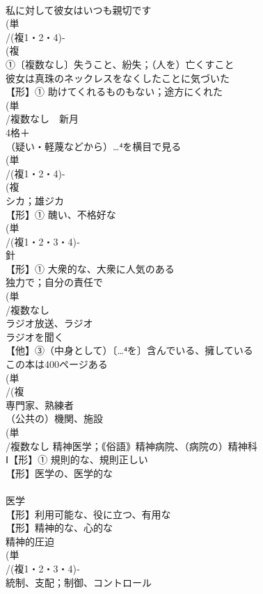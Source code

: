 \documentclass[8pt]{extreport}
\begin{document}
\begin{CJK}{UTF8}{min}
\\	私に対して彼女はいつも親切です
\\	(単
\\	/(複1・2・4)-
\\	(複
\\	①〔複数なし〕失うこと、紛失；（人を）亡くすこと 
\\	彼女は真珠のネックレスをなくしたことに気づいた
\\	【形】① 助けてくれるものもない；途方にくれた 
\\	(単
\\	/複数なし　新月 
\\	4格＋
\\	（疑い・軽蔑などから）…⁴を横目で見る
\\	(単
\\	/(複1・2・4)-
\\	(複
\\	シカ；雄ジカ 
\\	【形】① 醜い、不格好な 
\\	(単
\\	/(複1・2・3・4)‐
\\	針 
\\	【形】① 大衆的な、大衆に人気のある 
\\	独力で；自分の責任で
\\	(単
\\	/複数なし 
\\	ラジオ放送、ラジオ 
\\	ラジオを聞く
\\	【他】③（中身として）〔…⁴を〕含んでいる、擁している 
\\	この本は400ページある
\\	(単
\\	/(複
\\	専門家、熟練者 
\\	（公共の）機関、施設 
\\	(単
\\	/複数なし 精神医学；｟俗語｠精神病院、（病院の）精神科 
\\	Ⅰ【形】① 規則的な、規則正しい 
\\	【形】医学の、医学的な 
\\	[派生] 
\\	医学
\\	【形】利用可能な、役に立つ、有用な
\\	【形】精神的な、心的な 
\\	精神的圧迫
\\	(単
\\	/(複1・2・3・4)‐
\\	統制、支配；制御、コントロール

\end{CJK}
\end{document}
